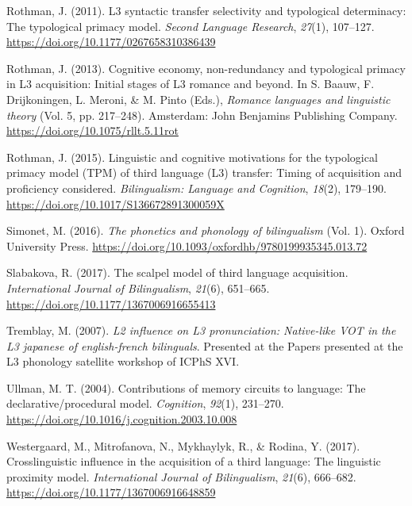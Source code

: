 \documentclass[
  man]{apa6}
\newlength{\cslhangindent}
\newlength{\cslentryspacingunit} %
\newenvironment{CSLReferences}[2] %
 {%
  \setlength{\parindent}{0pt}
  \ifodd #1
  \let\oldpar\par
  \def\par{\hangindent=\cslhangindent\oldpar}
  \fi
  \setlength{\parskip}{#2\cslentryspacingunit}
 }%
 {}
\begin{document}
\begin{CSLReferences}{1}{0}
\leavevmode{}%
Rothman, J. (2011). L3 syntactic transfer selectivity and typological determinacy: The typological primacy model. \emph{Second Language Research}, \emph{27}(1), 107--127. \url{https://doi.org/10.1177/0267658310386439}

\leavevmode{}%
Rothman, J. (2013). Cognitive economy, non-redundancy and typological primacy in L3 acquisition: Initial stages of L3 romance and beyond. In S. Baauw, F. Drijkoningen, L. Meroni, \& M. Pinto (Eds.), \emph{Romance languages and linguistic theory} (Vol. 5, pp. 217--248). Amsterdam: John Benjamins Publishing Company. \url{https://doi.org/10.1075/rllt.5.11rot}

\leavevmode{}%
Rothman, J. (2015). Linguistic and cognitive motivations for the typological primacy model ({TPM}) of third language (L3) transfer: Timing of acquisition and proficiency considered. \emph{Bilingualism: Language and Cognition}, \emph{18}(2), 179--190. \url{https://doi.org/10.1017/S136672891300059X}

\leavevmode{}%
Simonet, M. (2016). \emph{The phonetics and phonology of bilingualism} (Vol. 1). Oxford University Press. \url{https://doi.org/10.1093/oxfordhb/9780199935345.013.72}

\leavevmode{}%
Slabakova, R. (2017). The scalpel model of third language acquisition. \emph{International Journal of Bilingualism}, \emph{21}(6), 651--665. \url{https://doi.org/10.1177/1367006916655413}

\leavevmode{}%
Tremblay, M. (2007). \emph{L2 influence on L3 pronunciation: Native-like {VOT} in the L3 japanese of english-french bilinguals}. Presented at the Papers presented at the L3 phonology satellite workshop of {ICPhS} {XVI}.

\leavevmode{}%
Ullman, M. T. (2004). Contributions of memory circuits to language: The declarative/procedural model. \emph{Cognition}, \emph{92}(1), 231--270. \url{https://doi.org/10.1016/j.cognition.2003.10.008}

\leavevmode{}%
Westergaard, M., Mitrofanova, N., Mykhaylyk, R., \& Rodina, Y. (2017). Crosslinguistic influence in the acquisition of a third language: The linguistic proximity model. \emph{International Journal of Bilingualism}, \emph{21}(6), 666--682. \url{https://doi.org/10.1177/1367006916648859}


\end{CSLReferences}
\end{document}
